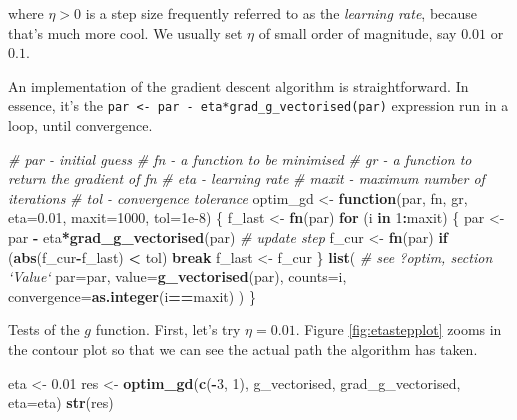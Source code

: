 \documentclass[10pt,b5paper,krantz1]{krantz}
\newenvironment{Shaded}{\begin{snugshade}}{\end{snugshade}}
\newcommand{\CommentTok}[1]{\textcolor[rgb]{0.37,0.37,0.37}{\textit{#1}}}
\newcommand{\ControlFlowTok}[1]{\textcolor[rgb]{0.27,0.27,0.27}{\textbf{#1}}}
\newcommand{\DataTypeTok}[1]{\textcolor[rgb]{0.27,0.27,0.27}{#1}}
\newcommand{\DecValTok}[1]{\textcolor[rgb]{0.06,0.06,0.06}{#1}}
\newcommand{\FloatTok}[1]{\textcolor[rgb]{0.06,0.06,0.06}{#1}}
\newcommand{\KeywordTok}[1]{\textcolor[rgb]{0.27,0.27,0.27}{\textbf{#1}}}
\newcommand{\NormalTok}[1]{#1}
\newcommand{\OperatorTok}[1]{\textcolor[rgb]{0.43,0.43,0.43}{\textbf{#1}}}
\newcommand{\StringTok}[1]{\textcolor[rgb]{0.5,0.5,0.5}{#1}}
\begin{document}
where \(\eta>0\) is a step size frequently
referred to as the \emph{learning rate}, because that's much more cool.
We usually set \(\eta\) of small order of magnitude, say \(0.01\) or \(0.1\).

An implementation of the gradient descent algorithm is straightforward.
In essence, it's the \texttt{par\ \textless{}-\ par\ -\ eta*grad\_g\_vectorised(par)} expression
run in a loop, until convergence.

\begin{Shaded}
\begin{Highlighting}[]
\CommentTok{# par   - initial guess}
\CommentTok{# fn    - a function to be minimised}
\CommentTok{# gr    - a function to return the gradient of fn}
\CommentTok{# eta   - learning rate}
\CommentTok{# maxit - maximum number of iterations}
\CommentTok{# tol   - convergence tolerance}
\NormalTok{optim_gd <-}\StringTok{ }\ControlFlowTok{function}\NormalTok{(par, fn, gr, }\DataTypeTok{eta=}\FloatTok{0.01}\NormalTok{,}
                        \DataTypeTok{maxit=}\DecValTok{1000}\NormalTok{, }\DataTypeTok{tol=}\FloatTok{1e-8}\NormalTok{) \{}
\NormalTok{    f_last <-}\StringTok{ }\KeywordTok{fn}\NormalTok{(par)}
    \ControlFlowTok{for}\NormalTok{ (i }\ControlFlowTok{in} \DecValTok{1}\OperatorTok{:}\NormalTok{maxit) \{}
\NormalTok{        par <-}\StringTok{ }\NormalTok{par }\OperatorTok{-}\StringTok{ }\NormalTok{eta}\OperatorTok{*}\KeywordTok{grad_g_vectorised}\NormalTok{(par) }\CommentTok{# update step}
\NormalTok{        f_cur <-}\StringTok{ }\KeywordTok{fn}\NormalTok{(par)}
        \ControlFlowTok{if}\NormalTok{ (}\KeywordTok{abs}\NormalTok{(f_cur}\OperatorTok{-}\NormalTok{f_last) }\OperatorTok{<}\StringTok{ }\NormalTok{tol) }\ControlFlowTok{break}
\NormalTok{        f_last <-}\StringTok{ }\NormalTok{f_cur}
\NormalTok{    \}}
    \KeywordTok{list}\NormalTok{( }\CommentTok{# see ?optim, section `Value`}
        \DataTypeTok{par=}\NormalTok{par,}
        \DataTypeTok{value=}\KeywordTok{g_vectorised}\NormalTok{(par),}
        \DataTypeTok{counts=}\NormalTok{i,}
        \DataTypeTok{convergence=}\KeywordTok{as.integer}\NormalTok{(i}\OperatorTok{==}\NormalTok{maxit)}
\NormalTok{    )}
\NormalTok{\}}
\end{Highlighting}
\end{Shaded}

Tests of the \(g\) function.
First, let's try \(\eta=0.01\).
Figure \ref{fig:etastepplot} zooms in the contour plot so that we can see
the actual path the algorithm has taken.

\begin{Shaded}
\begin{Highlighting}[]
\NormalTok{eta <-}\StringTok{ }\FloatTok{0.01}
\NormalTok{res <-}\StringTok{ }\KeywordTok{optim_gd}\NormalTok{(}\KeywordTok{c}\NormalTok{(}\OperatorTok{-}\DecValTok{3}\NormalTok{, }\DecValTok{1}\NormalTok{), g_vectorised, grad_g_vectorised, }\DataTypeTok{eta=}\NormalTok{eta)}
\KeywordTok{str}\NormalTok{(res)}
\end{Highlighting}
\end{Shaded}
\end{document}
